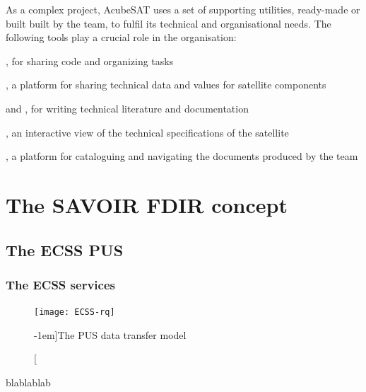 \documentclass[a4paper,nobib]{tufte-book}
\begin{document}
As a complex project, AcubeSAT uses a set of supporting utilities, ready-made or built built by the team, to fulfil its technical and organisational needs. The following tools play a crucial role in the organisation:
\begin{compactitem}
	\item {}, for sharing code and organizing tasks
	\item {}, a platform for sharing technical data and values for satellite components
	\item {} and , for writing technical literature and documentation
	\item {}, an interactive view of the technical specifications of the satellite
	\item {}, a platform for cataloguing and navigating the documents produced by the team
\end{compactitem}

\chapter{The SAVOIR \ac{FDIR} concept}

\section{The \acs{ECSS} \acl{PUS}}

\subsection{The \acs{ECSS} services}

\begin{figure}
	\texttt{[image: ECSS-rq]}
	\caption[][-1em]{The \ac{PUS} data transfer model}
	\label{fig:pusmodel}
\end{figure}

blablablab \autocite{ECSS-E-ST-70-41C,ECSS-E-70-41A,kaufeler_esa_standard_1994}
\end{document}
